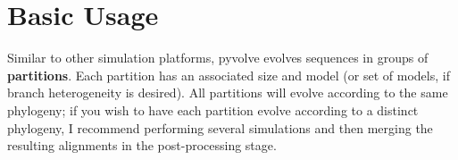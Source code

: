 \documentclass{article}
\begin{document}


\setlength{\parskip}{12pt}
\section{Basic Usage}

Similar to other simulation platforms, pyvolve evolves sequences in groups of \textbf{partitions}. Each partition has an associated size and model (or set of models, if branch heterogeneity is desired). All partitions will evolve according to the same phylogeny; if you wish to have each partition evolve according to a distinct phylogeny, I recommend performing several simulations and then merging the resulting alignments in the post-processing stage. 
\end{document}
